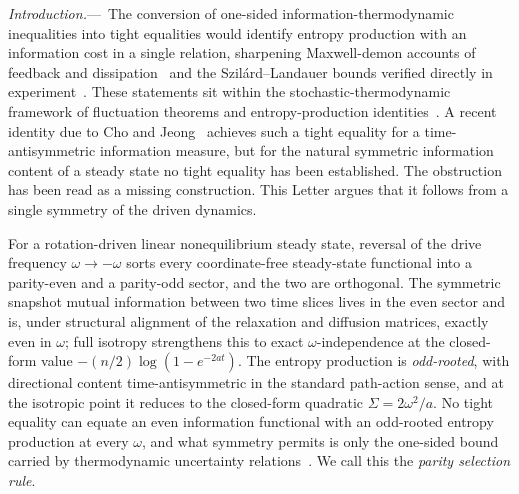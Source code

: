 \documentclass[%
 reprint,
 superscriptaddress,
 nofootinbib,
 nobibnotes,
 amsmath,amssymb,
 aps,
 prl,
 floatfix,
]{revtex4-2}
\newcommand{\plsection}[1]{\par\medskip\noindent\textit{#1.}---\,\ignorespaces}
\begin{document}
\plsection{Introduction}%
The conversion of one-sided information-thermodynamic inequalities into tight equalities would identify entropy production with an information cost in a single relation, sharpening Maxwell-demon accounts of feedback and dissipation~\cite{Horowitz2014,Ito2013,Sagawa2013,Seifert2012,Parrondo2015,Sagawa2008,Sagawa2010,Mandal2012,Hartich2014,Allahverdyan2009} and the Szil\'ard--Landauer bounds verified directly in experiment~\cite{Landauer1961,Bennett1982,Toyabe2010,Berut2012}. These statements sit within the stochastic-thermodynamic framework of fluctuation theorems and entropy-production identities~\cite{Jarzynski1997,Crooks1999,Sekimoto1998,Seifert2005,Esposito2010,Lebowitz1999,Schnakenberg1976}. A recent identity due to Cho and Jeong~\cite{Cho2025} achieves such a tight equality for a time-antisymmetric information measure, but for the natural symmetric information content of a steady state no tight equality has been established. The obstruction has been read as a missing construction. This Letter argues that it follows from a single symmetry of the driven dynamics.

For a rotation-driven linear nonequilibrium steady state, reversal of the drive frequency $\omega \to -\omega$ sorts every coordinate-free steady-state functional into a parity-even and a parity-odd sector, and the two are orthogonal. The symmetric snapshot mutual information between two time slices lives in the even sector and is, under structural alignment of the relaxation and diffusion matrices, exactly even in $\omega$; full isotropy strengthens this to exact $\omega$-independence at the closed-form value $-(n/2)\log(1-e^{-2at})$. The entropy production is \emph{odd-rooted}, with directional content time-antisymmetric in the standard path-action sense, and at the isotropic point it reduces to the closed-form quadratic $\Sigma = 2\omega^2/a$. No tight equality can equate an even information functional with an odd-rooted entropy production at every $\omega$, and what symmetry permits is only the one-sided bound carried by thermodynamic uncertainty relations~\cite{Barato2015,Gingrich2016,Horowitz2017,Hasegawa2019,Koyuk2020,Falasco2020,Manikandan2020,Skinner2021,Seifert2012}. We call this the \textit{parity selection rule}.
\end{document}
